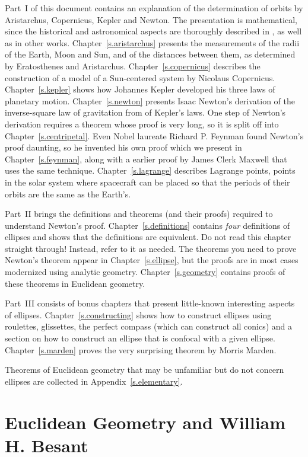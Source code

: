 Part~I of this document contains an explanation of the determination of orbits by Aristarchus, Copernicus, Kepler and Newton. The presentation is mathematical, since the historical and astronomical aspects are thoroughly described in \cite{hahn-cic}, as well as in other works. Chapter~\ref{s.aristarchus} presents the measurements of the radii of the Earth, Moon and Sun, and of the distances between them, as determined by Eratosthenes and Aristarchus. Chapter~\ref{s.copernicus} describes the construction of a model of a Sun-centered system by Nicolaus Copernicus. Chapter~\ref{s.kepler} shows how Johannes Kepler developed his three laws of planetary motion. Chapter~\ref{s.newton} presents Isaac Newton's derivation of the inverse-square law of gravitation from of Kepler's laws. One step of Newton's derivation requires a theorem whose proof is very long, so it is split off into Chapter~\ref{s.centripetal}. Even Nobel laureate Richard P. Feynman found Newton's proof daunting, so he invented his own proof which we present in Chapter~\ref{s.feynman}, along with a earlier proof by James Clerk Maxwell that uses the same technique. Chapter~\ref{s.lagrange} describes Lagrange points, points in the solar system where spacecraft can be placed so that the periods of their orbits are the same as the Earth's.

Part~II brings the definitions and theorems (and their proofs) required to understand Newton's proof. Chapter~\ref{s.definitions} contains \emph{four} definitions of ellipses and shows that the definitions are equivalent. Do not read this chapter straight through! Instead, refer to it as needed. The theorems you need to prove Newton's theorem appear in Chapter~\ref{s.ellipse}, but the proofs are in most cases modernized using analytic geometry.  Chapter~\ref{s.geometry} contains proofs of these theorems in Euclidean geometry.

Part~III consists of bonus chapters that present little-known interesting aspects of ellipses. Chapter~\ref{s.constructing} shows how to construct ellipses using roulettes, glissettes, the perfect compass (which can construct all conics) and a section on how to construct an ellipse that is  confocal with a given ellipse. Chapter~\ref{s.marden} proves the very surprising theorem by Morris Marden.

Theorems of Euclidean geometry that may be unfamiliar but do not concern ellipses are collected in Appendix~\ref{s.elementary}. 

\section*{Euclidean Geometry and William H. Besant}

